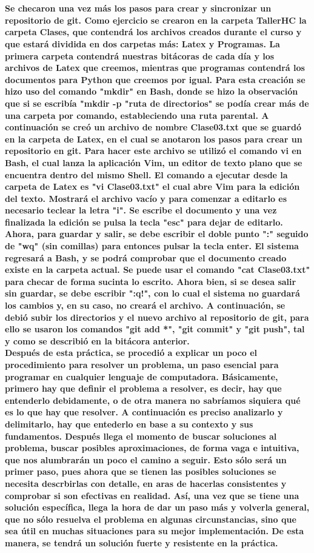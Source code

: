 \documentclass{book}
\begin{document}
		\paragraph{\\Se checaron una vez más los pasos para crear y sincronizar un repositorio de git. Como ejercicio se crearon en la carpeta TallerHC la carpeta Clases, que contendrá los archivos creados durante el curso y que estará dividida en dos carpetas más: Latex y Programas. La primera carpeta contendrá nuestras bitácoras de cada día y los archivos de Latex que creemos, mientras que programas contendrá los documentos para Python que creemos por igual. Para esta creación se hizo uso del comando "mkdir" en Bash, donde se hizo la observación que si se escribía "mkdir -p "ruta de directorios" se podía crear más de una carpeta por comando, estableciendo una ruta parental. A continuación se creó un archivo de nombre Clase03.txt que se guardó en la carpeta de Latex, en el cual se anotaron los pasos para crear un repositorio en git. Para hacer este archivo se utilizó el comando vi en Bash, el cual lanza la aplicación Vim, un editor de texto plano que se encuentra dentro del mismo Shell. El comando a ejecutar desde la carpeta de Latex es "vi Clase03.txt" el cual abre Vim para la edición del texto. Mostrará el archivo vacío y para comenzar a editarlo es necesario teclear la letra "i". Se escribe el documento y una vez finalizada la edición se pulsa la tecla "esc" para dejar de editarlo. Ahora, para guardar y salir, se debe escribir el doble punto ":" seguido de "wq" (sin comillas) para entonces pulsar la tecla enter. El sistema regresará a Bash, y se podrá comprobar que el documento creado existe en la carpeta actual. Se puede usar el comando "cat Clase03.txt" para checar de forma sucinta lo escrito. Ahora bien, si se desea salir sin guardar, se debe escribir ":q!", con lo cual el sistema no guardará los cambios y, en su caso, no creará el archivo. A continuación, se debió subir los directorios y el nuevo archivo al repositorio de git, para ello se usaron los comandos "git add *", "git commit" y "git push", tal y como se describió en la bitácora anterior.\\Después de esta práctica, se procedió a explicar un poco el procedimiento para resolver un problema, un paso esencial para programar en cualquier lenguaje de computadora. Básicamente, primero hay que definir el problema a resolver, es decir, hay que entenderlo debidamente, o de otra manera no sabríamos siquiera qué es lo que hay que resolver. A continuación es preciso analizarlo y delimitarlo, hay que entederlo en base a su contexto y sus fundamentos. Después llega el momento de buscar soluciones al problema, buscar posibles aproximaciones, de forma vaga e intuitiva, que nos alumbrarán un poco el camino a seguir. Esto sólo será un primer paso, pues ahora que se tienen las posibles soluciones se necesita descrbirlas con detalle, en aras de hacerlas consistentes y comprobar si son efectivas en realidad. Así, una vez que se tiene una solución específica, llega la hora de dar un paso más y volverla general, que no sólo resuelva el problema en algunas circunstancias, sino que sea útil en muchas situaciones para su mejor implementación. De esta manera, se tendrá un solución fuerte y resistente en la práctica.}
\end{document}
